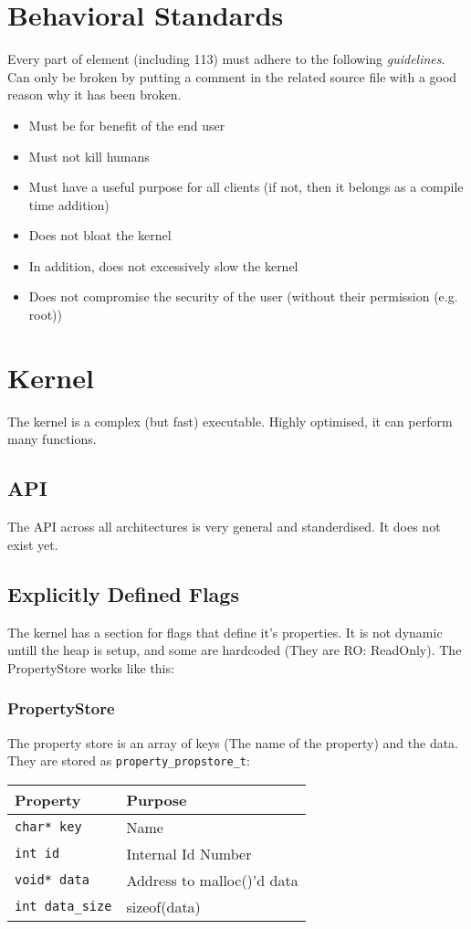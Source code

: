 \documentclass[12pt]{article}
\begin{document}
\section{Behavioral Standards}
Every part of element (including 113) must adhere to the following \emph{guidelines}. Can only be broken by putting a comment in the related source file with a good reason why it has been broken.
\begin{itemize}
  \item Must be for benefit of the end user
  \item Must not kill humans
  \item Must have a useful purpose for all clients (if not, then it belongs as a compile time addition)
  \item Does not bloat the kernel
  \item In addition, does not excessively slow the kernel
  \item Does not compromise the security of the user (without their permission (e.g. root))
\end{itemize}

\section{Kernel}
The kernel is a complex (but fast) executable. Highly optimised, it can perform many functions.
\subsection{API}
The API across all architectures is very general and standerdised. It does not exist yet.
\subsection{Explicitly Defined Flags}
The kernel has a section for flags that define it's properties. It is not dynamic untill the heap is setup, and some are hardcoded (They are RO: ReadOnly). The PropertyStore works like this:
\subsubsection{PropertyStore}
The property store is an array of keys (The name of the property) and the data. They are stored as \verb"property_propstore_t":

\begin{tabular}{ll}
\hline
Property & Purpose \\
\hline
\verb"char* key" & Name\\
\verb"int id" & Internal Id Number\\
\verb"void* data" & Address to malloc()'d data\\
\verb"int data_size" & sizeof(data)\\
\hline
\end{tabular}
\end{document}
